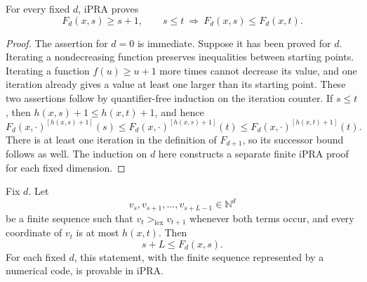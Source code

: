 \begin{lemma}
For every fixed $d$, iPRA proves
\[
 F_d(x,s)\ge s+1,
 \qquad
 s\le t\ \Longrightarrow\ F_d(x,s)\le F_d(x,t).
\]
\end{lemma}

\begin{proof}
The assertion for $d=0$ is immediate.  Suppose it has been proved for
$d$.  Iterating a nondecreasing function preserves inequalities between
starting points.  Iterating a function $f(u)\ge u+1$ more times cannot
decrease its value, and one iteration already gives a value at least one
larger than its starting point.  These two assertions follow by
quantifier-free induction on the iteration counter.  If $s\le t$, then
$h(x,s)+1\le h(x,t)+1$, and hence
\[
 F_d(x,\cdot)^{[h(x,s)+1]}(s)
 \le F_d(x,\cdot)^{[h(x,s)+1]}(t)
 \le F_d(x,\cdot)^{[h(x,t)+1]}(t).
\]
There is at least one iteration in the definition of $F_{d+1}$, so its
successor bound follows as well.  The induction on $d$ here constructs a
separate finite iPRA proof for each fixed dimension.
\end{proof}

\begin{theorem}
\label{thm:controlled-lex}
Fix $d$.  Let
\[
 v_s,v_{s+1},\ldots,v_{s+L-1}\in\mathbb N^d
\]
be a finite sequence such that $v_t>_{\mathrm{lex}}v_{t+1}$ whenever both
terms occur, and every coordinate of $v_t$ is at most $h(x,t)$.  Then
\[
                         s+L\le F_d(x,s).
\]
For each fixed $d$, this statement, with the finite sequence represented
by a numerical code, is provable in iPRA.
\end{theorem}

